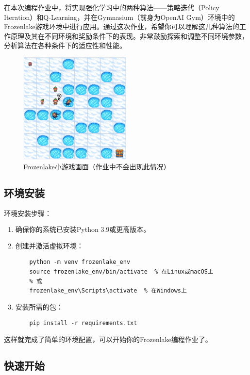 \documentclass[a4paper,12pt]{article}
\begin{document}
在本次编程作业中，将实现强化学习中的两种算法——策略迭代（Policy Iteration）和Q-Learning，并在Gymnasium（前身为OpenAI Gym）环境中的Frozenlake游戏环境中进行应用。通过这次作业，希望你可以理解这几种算法的工作原理及其在不同环境和奖励条件下的表现。非常鼓励探索和调整不同环境参数，分析算法在各种条件下的适应性和性能。

\begin{figure}[ht]
  \centering
    \includegraphics[width=0.5\textwidth]{frozenlake.png}
    \caption{Frozenlake小游戏画面（作业中不会出现此情况）}
  	\label{fig:frozenlake}
\end{figure}

\subsection{环境安装}

环境安装步骤：

\begin{enumerate}
    \item 确保你的系统已安装Python 3.9或更高版本。
    \item 创建并激活虚拟环境：
    \begin{verbatim}
    python -m venv frozenlake_env
    source frozenlake_env/bin/activate  % 在Linux或macOS上
    % 或
    frozenlake_env\Scripts\activate  % 在Windows上
    \end{verbatim}
    \item 安装所需的包：
    \begin{verbatim}
    pip install -r requirements.txt
    \end{verbatim}
\end{enumerate}

这样就完成了简单的环境配置，可以开始你的Frozenlake编程作业了。

\subsection{快速开始}
\end{document}
